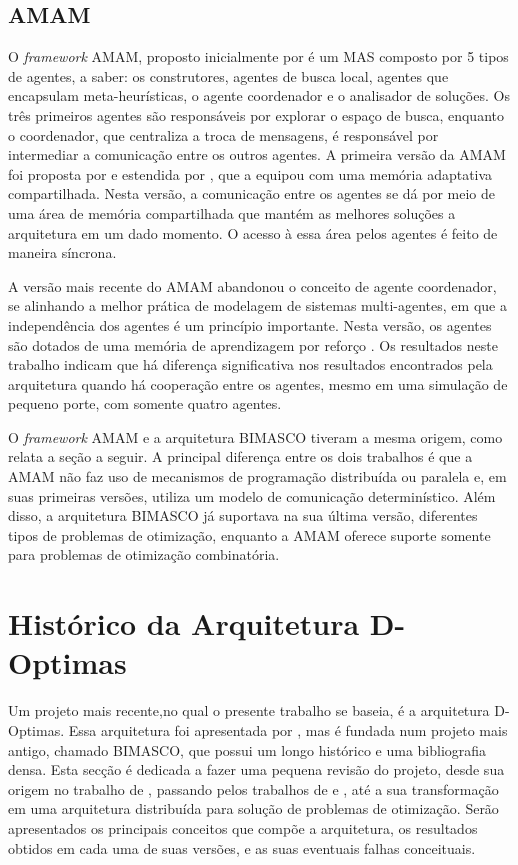 \subsection{AMAM}
O \textit{framework} AMAM, proposto inicialmente por  é um MAS composto por 5 tipos de agentes, a saber: os construtores, agentes de busca local, agentes que encapsulam meta-heurísticas, o agente coordenador e o analisador de soluções. Os três primeiros agentes são responsáveis por explorar o espaço de busca, enquanto o coordenador, que centraliza a troca de mensagens, é responsável por intermediar a comunicação entre os outros agentes. A primeira versão da AMAM foi proposta por  e estendida por , que a equipou com uma memória adaptativa compartilhada. Nesta versão, a comunicação entre os agentes se dá por meio de uma área de memória compartilhada que mantém as melhores soluções a arquitetura em um dado momento. O acesso à essa área pelos agentes é feito de maneira síncrona.  

A versão mais recente do AMAM abandonou o conceito de agente coordenador, se alinhando a melhor prática de modelagem de sistemas multi-agentes, em que a independência dos agentes é um princípio importante. Nesta versão, os agentes são dotados de uma memória de aprendizagem por reforço \cite{silva2015}. Os resultados neste trabalho indicam que há diferença significativa nos resultados encontrados pela arquitetura quando há  cooperação entre os agentes, mesmo em uma simulação de pequeno porte, com somente quatro agentes.

O \textit{framework} AMAM e a arquitetura BIMASCO tiveram a mesma origem, como relata a seção a seguir. A principal diferença entre os dois trabalhos é que a AMAM não faz uso de mecanismos de programação distribuída ou paralela e, em suas primeiras versões, utiliza um modelo de comunicação determinístico. Além disso, a arquitetura BIMASCO já suportava na sua última versão, diferentes tipos de problemas de otimização, enquanto a AMAM  oferece suporte somente para problemas de otimização combinatória.

\section{Histórico da Arquitetura D-Optimas}
\label{sec:histBimasco}

Um projeto mais recente,no qual o presente trabalho se baseia, é a arquitetura D-Optimas. Essa arquitetura foi apresentada por , mas é fundada num projeto mais antigo, chamado BIMASCO, que possui um longo histórico e uma bibliografia densa. Esta secção é dedicada a fazer uma pequena revisão do projeto, desde sua origem no trabalho de , passando pelos trabalhos de  e , até a sua transformação em uma arquitetura distribuída para solução de problemas de otimização. Serão apresentados os principais conceitos que compõe a arquitetura, os resultados obtidos em cada uma de suas versões, e as suas eventuais falhas conceituais.

